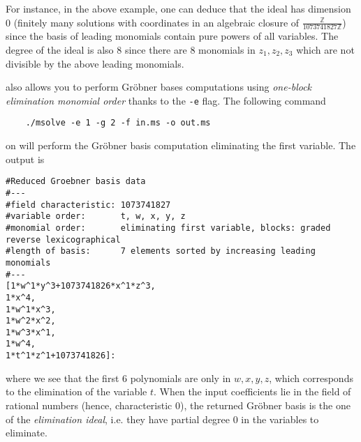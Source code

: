 \documentclass[a4paper,english,11pt]{scrartcl}
\theoremstyle{definition}
\theoremstyle{remark}
\begin{document}
For instance, in the above example, one can deduce that the ideal has dimension
$0$ (finitely many solutions with coordinates in an algebraic closure of
$\frac{\mathbb{Z}}{1073741827\mathbb{Z}}$) since the basis of leading monomials
contain pure powers of all variables. The degree of the ideal is also $8$ since
there are $8$ monomials in $z_1, z_2, z_3$ which are not divisible by the above
leading monomials.

\msolve also allows you to perform Gröbner bases computations using 
\emph{one-block elimination monomial order}
thanks to the \verb+-e+ flag. The following command 
\begin{tcolorbox} %
  \begin{verbatim}
    ./msolve -e 1 -g 2 -f in.ms -o out.ms
  \end{verbatim}
\end{tcolorbox}
on
will perform the Gröbner basis computation eliminating the first
variable.
The output is
\begin{tcolorbox}
  \begin{lstlisting}
#Reduced Groebner basis data
#---
#field characteristic: 1073741827
#variable order:       t, w, x, y, z
#monomial order:       eliminating first variable, blocks: graded reverse lexicographical
#length of basis:      7 elements sorted by increasing leading monomials
#---
[1*w^1*y^3+1073741826*x^1*z^3,
1*x^4,
1*w^1*x^3,
1*w^2*x^2,
1*w^3*x^1,
1*w^4,
1*t^1*z^1+1073741826]:
  \end{lstlisting}
\end{tcolorbox}
where we see that the first $6$ polynomials are only in $w,x,y,z$,
which corresponds to the elimination of the variable $t$. When the input
coefficients lie in the field of rational numbers (hence, characteristic $0$),
the returned Gröbner basis is the one of the {\em elimination ideal}, i.e. they
have partial degree $0$ in the variables to eliminate.
\end{document}
